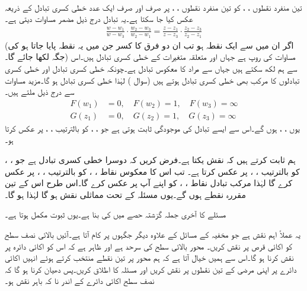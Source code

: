 \quad {}\\
تین منفرد نقطوں ، ،  کو تین منفرد نقطوں ، ،  پر صرف اور صرف ایک عدد خطی کسری تبادل  کے ذریعہ عکس کیا جا سکتا ہے۔یہ تبادل درج ذیل مضمر مساوات دیتی ہے۔
\begin{align}\label{مساوات_نقش_کا_حصول}
\frac{w-w_1}{w-w_3}\cdot \frac{w_2-w_3}{w_2-w_1}=\frac{z-z_1}{z-z_3}\cdot \frac{z_2-z_3}{z_2-z_1}
\end{align}
(اگر ان میں سے ایک نقطہ  ہو تب ان دو فرق کا کسر جن میں یہ نقطہ پایا جاتا ہو کی جگہ  لکھا جائے گا۔)
\quad
مساوات  کی روپ   ہے جہاں  اور  متعلقہ متغیرات کے خطی کسری تبادل ہیں۔اس سے ہم  لکھ سکتے ہیں جہاں  سے مراد  کا معکوس تبادل ہے۔چونکہ خطی کسری تبادل اور خطی کسری تبادلوں کا مرکب بھی خطی کسری تبادل ہوتے ہیں (سوال ) لہٰذا  خطی کسری تبادل ہو گا۔مزید مساوات  سے درج ذیل ملتے ہیں۔
\begin{align*}
F(w_1)&=0,\quad F(w_2)=1,\quad F(w_3)=\infty\\
G(z_1)&=0,\quad G(z_2)=1,\quad G(z_3)=\infty
\end{align*}
یوں ، ،  ہوں گے۔اس سے  ایسے تبادل  کی موجودگی ثابت ہوتی ہے جو ، ،  کو بالترتیب  ، ،  پر عکس کرتا ہو۔ 

ہم ثابت کرتے ہیں کہ نقش  یکتا ہے۔فرض کریں کہ   دوسرا خطی کسری تبادل ہے جو  ، ،  کو بالترتیب  ، ،  پر عکس کرتا ہے۔ تب اس کا معکوس  نقاط ، ،   کو بالترتیب  ، ،  پر عکس کرے گا لہٰذا مرکب تبادل  نقاط ، ،  کو اپنے آپ پر عکس کرے گا۔اس طرح اس کے تین مقررہ نقطے ہوں گے۔یوں مسئلہ  کے تحت  مماثلی نقش ہو گا لہٰذا  ہو گا۔

مسئلے کا آخری جملہ  گزشتہ حصے میں  کی بنا ہے۔یوں ثبوت مکمل ہوتا ہے۔

 یہ عملاً اہم نقش ہے جو  مخفیہ کے مسائل کے علاوہ دیگر جگہوں پر کام آتا ہے۔آئیں بالائی نصف سطح  کو اکائی قرص  پر نقش کریں۔ محور  بالائی سطح کی سرحد  ہے اور ظاہر ہے کہ اس کو اکائی دائرہ  پر نقش کرنا ہو گا۔اس سے ہمیں خیال آتا ہے کہ ہم محور  پر تین نقطے منتخب کرتے ہوئے  انہیں اکائی دائرے پر  اپنی مرضی کے تین نقطوں پر نقش کریں اور  مسئلہ  کا اطلاق کریں۔پس دھیان کرنا ہو گا کہ نصف سطح  اکائی دائرے کے اندر نا کہ باہر نقش ہو۔

